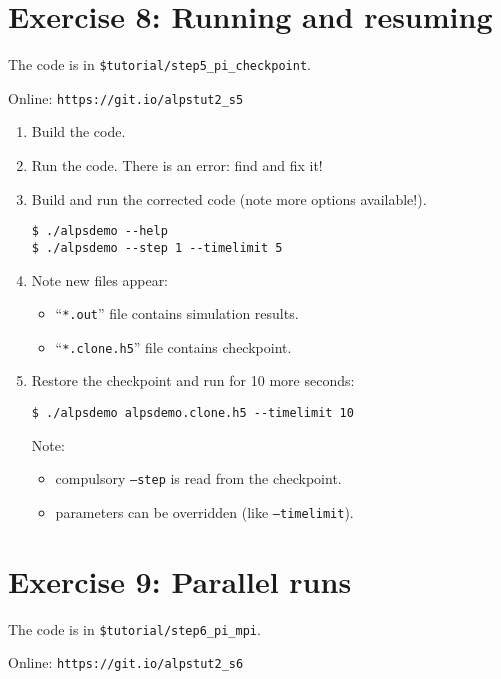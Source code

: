 \documentclass[12pt]{article}
\newcommand{\code}[1]{\texttt{#1}}
\begin{document}
\section*{Exercise 8: Running and resuming}

The code is in \texttt{\color{ballblue}\$tutorial/step5\_pi\_checkpoint}.

Online: \nolinkurl{https://git.io/alpstut2_s5}

\begin{enumerate}
\item Build the code.
\item Run the code. There is an error: find and fix it!
\item Build and run the corrected code (note more options available!).
  \begin{lstlisting}
$ ./alpsdemo --help
$ ./alpsdemo --step 1 --timelimit 5
  \end{lstlisting}
\item Note new files appear:
  \begin{itemize}
  \item  ``\code{*.out}'' file contains simulation results.
  \item  ``\code{*.clone.h5}'' file contains checkpoint.
  \end{itemize}
\item Restore the checkpoint and run for 10 more seconds:
  \begin{lstlisting}
$ ./alpsdemo alpsdemo.clone.h5 --timelimit 10 
\end{lstlisting} %
Note:
  \begin{itemize}
  \item compulsory \code{--step} is read from the checkpoint.
  \item parameters can be overridden (like \code{--timelimit}).
  \end{itemize}
\end{enumerate}


\section*{Exercise 9: Parallel runs}

The code is in \texttt{\color{ballblue}\$tutorial/step6\_pi\_mpi}.

Online: \nolinkurl{https://git.io/alpstut2_s6}
\end{document}
